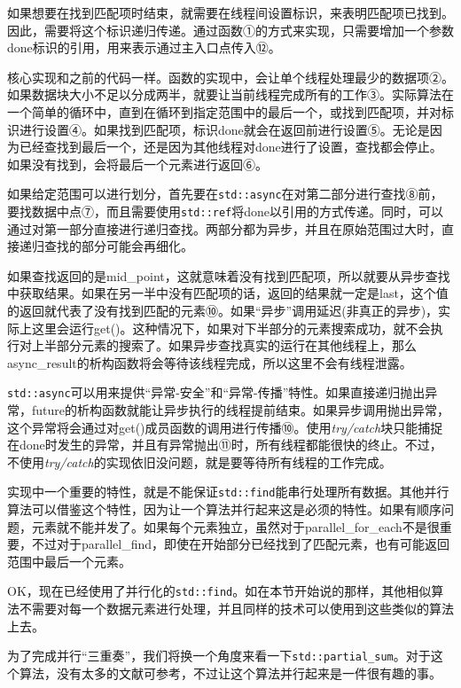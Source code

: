 如果想要在找到匹配项时结束，就需要在线程间设置标识，来表明匹配项已找到。因此，需要将这个标识递归传递。通过函数①的方式来实现，只需要增加一个参数done标识的引用，用来表示通过主入口点传入⑫。

核心实现和之前的代码一样。函数的实现中，会让单个线程处理最少的数据项②。如果数据块大小不足以分成两半，就要让当前线程完成所有的工作③。实际算法在一个简单的循环中，直到在循环到指定范围中的最后一个，或找到匹配项，并对标识进行设置④。如果找到匹配项，标识done就会在返回前进行设置⑤。无论是因为已经查找到最后一个，还是因为其他线程对done进行了设置，查找都会停止。如果没有找到，会将最后一个元素进行返回⑥。

如果给定范围可以进行划分，首先要在\texttt{std::async}在对第二部分进行查找⑧前，要找数据中点⑦，而且需要使用\texttt{std::ref}将done以引用的方式传递。同时，可以通过对第一部分直接进行递归查找。两部分都为异步，并且在原始范围过大时，直接递归查找的部分可能会再细化。

如果查找返回的是mid\_point，这就意味着没有找到匹配项，所以就要从异步查找中获取结果。如果在另一半中没有匹配项的话，返回的结果就一定是last，这个值的返回就代表了没有找到匹配的元素⑩。如果“异步”调用延迟(非真正的异步)，实际上这里会运行get()。这种情况下，如果对下半部分的元素搜索成功，就不会执行对上半部分元素的搜索了。如果异步查找真实的运行在其他线程上，那么async\_result的析构函数将会等待该线程完成，所以这里不会有线程泄露。

\texttt{std::async}可以用来提供“异常-安全”和“异常-传播”特性。如果直接递归抛出异常，future的析构函数就能让异步执行的线程提前结束。如果异步调用抛出异常，这个异常将会通过对get()成员函数的调用进行传播⑩。使用\textit{try/catch}块只能捕捉在done时发生的异常，并且有异常抛出⑪时，所有线程都能很快的终止。不过，不使用\textit{try/catch}的实现依旧没问题，就是要等待所有线程的工作完成。

实现中一个重要的特性，就是不能保证\texttt{std::find}能串行处理所有数据。其他并行算法可以借鉴这个特性，因为让一个算法并行起来这是必须的特性。如果有顺序问题，元素就不能并发了。如果每个元素独立，虽然对于parallel\_for\_each不是很重要，不过对于parallel\_find，即使在开始部分已经找到了匹配元素，也有可能返回范围中最后一个元素。

OK，现在已经使用了并行化的\texttt{std::find}。如在本节开始说的那样，其他相似算法不需要对每一个数据元素进行处理，并且同样的技术可以使用到这些类似的算法上去。

为了完成并行“三重奏”，我们将换一个角度来看一下\texttt{std::partial\_sum}。对于这个算法，没有太多的文献可参考，不过让这个算法并行起来是一件很有趣的事。



